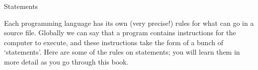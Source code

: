 \begin{comment}
You can tell your compiler to use the modern standard:
\begin{verbatim}
  icpc -std=c++17 [other options]
\end{verbatim}
but to save yourself a lot of typing, you can define
\begin{verbatim}
  alias icpc='icpc -std=c++17'
\end{verbatim}
in your shell startup files.
\begin{tacc}
  On the class \n{isp} machine this alias has been defined by default.
\end{tacc}

\begin{slide}{C++ versions}
  \label{sl:cpp-version}
  \begin{itemize}
  \item
    The compiler by default uses \n{C++98}. 
  \item This course explains \n{C++17}. You need tell your compiler
    about this.
  \item On \n{isp.tacc.utexas.edu} `icpc' uses this by default.
  \item On your own machine you need to do
\begin{verbatim}
  g++ -std=c++17 [other options]
\end{verbatim}
or
\begin{verbatim}
  alias g++='g++ -std=c++17'
\end{verbatim}
  \end{itemize}
\end{slide}
\end{comment}

 {Statements}
\label{sec:statements}

Each programming language has its own (very precise!) rules for what
can go in a source file. Globally we can say that a program contains
instructions for the computer to execute, and these instructions take
the form of a bunch of `statements'. Here are some of the rules on
statements; you will learn them in more detail as you go through this
book.


